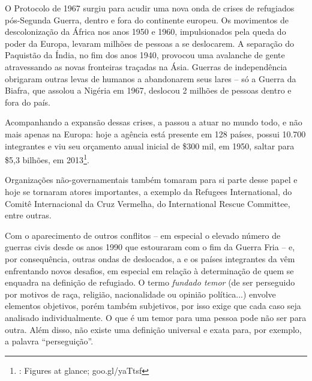 O Protocolo de 1967 surgiu para acudir uma nova onda de crises de
refugiados pós-Segunda Guerra, dentro e fora do continente europeu. Os
movimentos de descolonização da África nos anos 1950 e 1960,
impulsionados pela queda do poder da Europa, levaram milhões de pessoas
a se deslocarem. A separação do Paquistão da Índia, no fim dos anos
1940, provocou uma avalanche de gente atravessando as novas fronteiras
traçadas na Ásia. Guerras de independência obrigaram outras levas de
humanos a abandonarem seus lares -- só a Guerra da Biafra, que assolou
a Nigéria em 1967, deslocou 2 milhões de pessoas dentro e fora do país.

Acompanhando a expansão dessas crises, a  passou a atuar no mundo
todo, e não mais apenas na Europa: hoje a agência está presente em 128
países, possui 10.700 integrantes e viu seu orçamento anual inicial de
\$300 mil, em 1950, saltar para \$5,3 bilhões, em 2013\footnote{
	: Figures at glance; 
	goo.gl/yaTtsf}.

Organizações não-governamentais também tomaram para si parte desse papel
e hoje se tornaram atores importantes, a exemplo da Refugees
International, do Comitê Internacional da Cruz Vermelha, do
International Rescue Committee, entre outras.

Com o aparecimento de outros conflitos -- em especial o elevado número
de guerras civis desde os anos 1990 que estouraram com o fim da Guerra
Fria -- e, por consequência, outras ondas de deslocados, a  e os
países integrantes da  vêm enfrentando novos desafios, em especial
em relação à determinação de quem se enquadra na definição de refugiado.
O termo \emph{fundado temor} (de ser perseguido por motivos de raça,
religião, nacionalidade ou opinião política...) envolve elementos
objetivos, porém também subjetivos, por isso exige que cada caso seja
analisado individualmente. O que é um temor para uma pessoa pode não ser
para outra. Além disso, não existe uma definição universal e exata para,
por exemplo, a palavra ``perseguição''.

